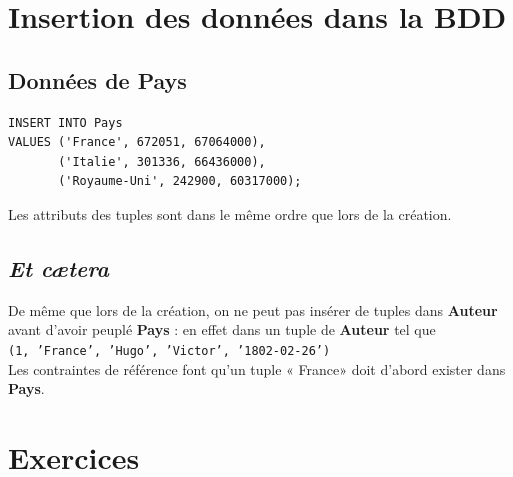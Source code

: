 \documentclass[10pt,cours,a4paper,firamath]{nsi}
\begin{document}
\section{Insertion des données dans la BDD}


\subsection{Données de \textbf{Pays}}
\begin{sql}
    \begin{verbatim}
INSERT INTO Pays
VALUES ('France', 672051, 67064000),
       ('Italie', 301336, 66436000),
       ('Royaume-Uni', 242900, 60317000);
\end{verbatim}
\end{sql}
Les attributs des tuples sont dans le même ordre que lors de la création.


\subsection{\textit{Et c\ae tera}}
De même que lors de la création, on ne peut pas insérer de tuples dans \textbf{Auteur} avant d'avoir peuplé \textbf{Pays} : en effet dans un tuple de \textbf{Auteur} tel que \\

\texttt{(1, 'France', 'Hugo', 'Victor', '1802-02-26')}\\

Les contraintes de référence font qu'un tuple « France» doit d'abord exister dans \textbf{Pays}.
\section{Exercices}
\end{document}
